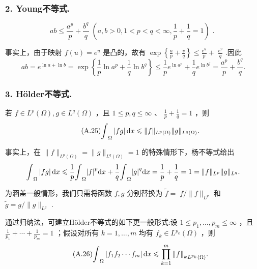 \subsubsection*{2. Young不等式.}
\begin{equation}\tag{A.24}\label{eq:app-A-24}
{ab} \leq  \frac{{a}^{p}}{p} + \frac{{b}^{q}}{q}\;\left( {a,b > 0,1 < p < q < \infty ,\frac{1}{p} + \frac{1}{q} = 1}\right) \text{ . }
\end{equation}

事实上，由于映射 $f\left( u\right)  = {e}^{u}$ 是凸的，故有 $\exp \left\{  {\frac{u}{p} + \frac{v}{q}}\right\}   \leq  \frac{{e}^{u}}{p} + \; \frac{{e}^{v}}{q}$ .因此
\[
{ab} = {e}^{\ln a + \ln b} = \exp \left\{  {\frac{1}{p}\ln {a}^{p} + \frac{1}{q}\ln {b}^{q}}\right\}   \leq  \frac{1}{p}{e}^{\ln {a}^{p}} + \frac{1}{q}{e}^{\ln {b}^{q}} = \frac{{a}^{p}}{p} + \frac{{b}^{q}}{q}.
\]

\subsubsection*{3. Hölder不等式.}若 $f \in  {L}^{p}\left( \Omega \right) ,g \in  {L}^{q}\left( \Omega \right)$ ，且 $1 \leq  p,q \leq  \infty$ 、 $\frac{1}{p} + \frac{1}{q} = 1$ ，则
\begin{equation}\tag{A.25}\label{eq:app-A-25}
{\int }_{\Omega }\left| {fg}\right| {\mathop{}\!\mathrm{d} x} \leqslant  \| f{\| }_{{L}^{p}\left( \Omega \right) }\| g{\| }_{{L}^{q}\left( \Omega \right) }.
\end{equation}

事实上，在 $\| f{\| }_{{L}^{p}\left( \Omega \right) } = \| g{\| }_{{L}^{q}\left( \Omega \right) } = 1$ 的特殊情形下，杨不等式给出
\[
{\int }_{\Omega }\left| {fg}\right| {\mathop{}\!\mathrm{d} x} \leqslant  \frac{1}{p}{\int }_{\Omega }{\left| f\right| }^{p}{\mathop{}\!\mathrm{d} x} + \frac{1}{q}{\int }_{\Omega }{\left| g\right| }^{q}{\mathop{}\!\mathrm{d} x} = \frac{1}{p} + \frac{1}{q} = 1 = \| f{\| }_{{L}^{p}}\| g{\| }_{{L}^{q}}.
\]

为涵盖一般情形，我们只需将函数 $f,g$ 分别替换为 $\widetilde{f} = \; f/\| f{\| }_{{L}^{p}}$ 和 $\widetilde{g} = g/\| g{\| }_{{L}^{q}}$ .

通过归纳法，可建立Hölder不等式的如下更一般形式:设 $1 \leq  {p}_{1},\ldots ,{p}_{m} \leq  \infty$ ，且 $\frac{1}{{p}_{1}} + \cdots  + \frac{1}{{p}_{m}} = 1$ ；假设对所有 $k = 1,\ldots ,m$ 均有 ${f}_{k} \in  {L}^{{p}_{k}}\left( \Omega \right)$ ，则
\begin{equation}\tag{A.26}\label{eq:app-A-26}
{\int }_{\Omega }\left| {{f}_{1}{f}_{2}\cdots {f}_{m}}\right| {\mathop{}\!\mathrm{d} x} \leqslant  \mathop{\prod }\limits_{{k = 1}}^{m}{\norm{f}_{k}}_{{L}^{{p}_{k}}\left( \Omega \right) }.
\end{equation}

